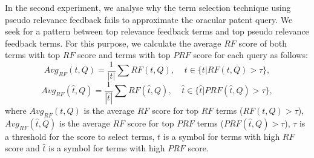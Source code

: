 In the second experiment, we analyse why the term selection technique using pseudo relevance feedback fails to approximate the oracular patent query.  
We seek for a pattern between top relevance feedback terms and top pseudo relevance feedback terms. For this purpose, we calculate the average $\mathit{RF}$ score of both terms with top  $\mathit{RF}$ score and terms with top $\mathit{PRF}$ score for each query as follows:
\begin{equation}
Avg_{RF}(t, Q) = \frac{1}{|t|}\sum {RF}(t, Q), \;\;\;\; t\in \{t | RF(t, Q)>\tau\},
\end{equation}
\begin{equation}
Avg_{RF}(\hat{t}, Q) = \frac{1}{|\hat{t}|}\sum {RF}(\hat{t}, Q), \;\;\;\; \hat{t}\in \{\hat{t} | PRF(\hat{t}, Q)>\tau\},
\end{equation}
where $Avg_{RF}(t, Q)$ is the average  $\mathit{RF}$ score for top  $\mathit{RF}$ terms ($RF(t, Q)>\tau$), $Avg_{RF}(\hat{t}, Q)$ is the average  $\mathit{RF}$ score for top  $\mathit{PRF}$ terms ($PRF(\hat{t}, Q)>\tau$), $\tau$ is a threshold for the score to select terms, $t$ is a symbol for terms with high $\mathit{RF}$ score and $\hat{t}$ is a symbol for terms with high $\mathit{PRF}$ score.

